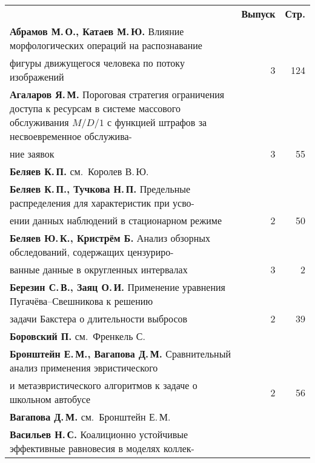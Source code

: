 {\tabcolsep=3pt
\begin{tabular}{p{388pt}rr}
&\textbf{Выпуск} & \textbf{Стр.}\\[6pt]
\textbf{Абрамов М.\,О., Катаев М.\,Ю.} Влияние морфологических операций
на распознавание\linebreak
\\[-12pt]
\hspace*{21pt}фигуры движущегося человека по потоку
изображений&3&124\\
\hangindent=21pt\noindent\textbf{Агаларов Я.\,М.} Пороговая стратегия ограничения доступа
к ресурсам в сис\-те\-ме массового обслуживания $M/D/1$ с функцией штрафов за
несвоевременное обслужива-\linebreak
\\[-12pt]
\hspace*{21pt}ние заявок&3&55\\
\textbf{Беляев К.\,П.} см.\ Королев В.\,Ю.&&\\
\textbf{Беляев К.\,П., Тучкова Н.\,П.} Предельные распределения для
характеристик при усво-\linebreak
\\[-12pt]
\hspace*{21pt}ении данных наблюдений в стационарном режиме&2&50\\
\textbf{Беляев Ю.\,К., Кристрём Б.} Анализ обзорных обследований,
содержащих цензуриро-\linebreak
\\[-12pt]
\hspace*{21pt}ванные данные в округленных интервалах&3&2\\
\textbf{Березин С.\,В., Заяц О.\,И.} Применение уравнения
Пугачёва--Свешникова к решению\linebreak
\\[-12pt]
\hspace*{21pt}задачи Бакстера о длительности выбросов&2&39\\
\textbf{Боровский П.} см.\ Френкель С.&&\\
\textbf{Бронштейн Е.\,М., Вагапова Д.\,М.} Сравнительный анализ
применения эвристического\linebreak
\\[-12pt]
\hspace*{21pt}и метаэвристического алгоритмов к задаче о
школьном автобусе&2&56\\
\textbf{Вагапова Д.\,М.} см.\ Бронштейн Е.\,М.&&\\
\textbf{Васильев Н.\,С.} Коалиционно устойчивые эффективные равновесия
в моделях коллек-\linebreak

\end{tabular}}
